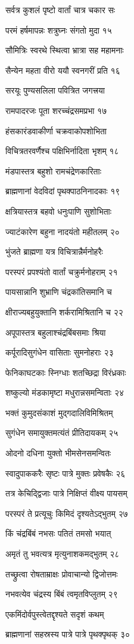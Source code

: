 सर्वत्र कुशलं पृष्टो वार्तां चात्र चकार सः

परमं हर्षमापन्नः शत्रुघ्नः संगतो मुदा १५

सौमित्रिः स्वरथे स्थित्वा भ्रात्रा सह महामनाः

सैन्येन महता वीरो ययौ स्वनगरीं प्रति १६

सरयूः पुण्यसलिला पवित्रित जगत्त्रया

रामपादरजः पूता शरच्चंद्रसमप्रभा १७

हंसकारंडवाकीर्णा चक्रवाकोपशोभिता

विचित्रतरवर्णैश्च पक्षिभिर्नादिता भृशम् १८

मंडपास्तत्र बहुशो रामचंद्रेणकारिताः

ब्राह्मणानां वेदविदां पृथक्पाठनिनादकाः १९

क्षत्रियास्तत्र बहवो धनुःपाणि सुशोभिताः

ज्याटंकारेण बहुना नादयंतो महीतलम् २०

भुंजते ब्राह्मणा यत्र विचित्रान्नैर्मनोहरैः

परस्परं प्रपश्यंतो वार्तां चक्रुर्मनोहराम् २१

पायसान्नानि शुभ्राणि चंद्रकांतिसमानि च

क्षीराज्यबहुयुक्तानि शर्करामिश्रितानि च २२

अपूपास्तत्र बहुलाश्चंद्रबिंबसमाः श्रिया

कर्पूरादिसुगंधेन वासिताः सुमनोहराः २३

फेनिकाघटकाः स्निग्धाः शतच्छिद्रा विरंध्रकाः

शष्कुल्यो मंडकामृष्टा मधुरान्नसमन्विताः २४

भक्तं कुमुदसंकाशं मुद्गदालिविमिश्रितम्

सुगंधेन समायुक्तमत्यंतं प्रीतिदायकम् २५

ओदनो दधिना युक्तो भीमसेनसमन्वितः

स्वादुपाककरैः सृष्टः पात्रे मुक्तः प्रवेषकैः २६

तत्र केचिद्द्विजाः पात्रे निक्षिप्तं वीक्ष्य पायसम्

परस्परं ते प्रत्यूचुः किमिदं दृश्यतेऽद्भुतम् २७

किं चंद्रबिंबं नभसः पतितं तमसो भयात्

अमृतं तु भवत्यत्र मृत्युनाशकमद्भुतम् २८

तच्छ्रुत्वा रोषताम्राक्षः प्रोवाचान्यो द्विजोत्तमः

नभवत्येव चंद्रस्य बिंबं त्वमृतविप्लुतम् २९

एकमिंदोर्वपुस्त्वेतद्दृश्यते सदृशं कथम्

ब्राह्मणानां सहस्रस्य पात्रे पात्रे पृथक्पृथक् ३०

